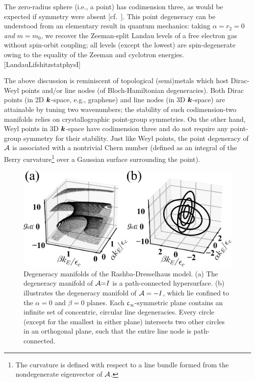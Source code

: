 \documentclass[aps, prb, showpacs, twocolumn, notitlepage, superscriptaddress]{revtex4-1}
\begin{document}
The zero-radius sphere (i.e., a point) has codimension three, as would be expected if symmetry were absent [cf.\ ].    This point degeneracy can be understood from an elementary result in quantum mechanics: taking $\alpha{=}r_2{=}0$ \textit{and} $m{=}m_0$, we recover the Zeeman-split Landau levels of a free electron gas without spin-orbit coupling; all levels (except the lowest) are spin-degenerate owing to the equality of the Zeeman and cyclotron energies.[LandauLifshitzstatphysI]

The above discussion is reminiscent of topological (semi)metals which host Dirac-Weyl points and/or line nodes (of Bloch-Hamiltonian degeneracies). Both Dirac points (in 2D $\boldsymbol{k}$-space, e.g., graphene) and  line nodes (in 3D $\boldsymbol{k}$-space) are attainable by tuning two wavenumbers; the stability of such codimension-two manifolds
 relies on crystallographic point-group symmetries. On the other hand,  Weyl points in 3D $\boldsymbol{k}$-space have codimension three and do not require any  point-group symmetry for their stability. Just like Weyl points, the point degeneracy of ${\cal A}$ is associated with a nontrivial Chern number (defined as an integral of the Berry curvature\footnote{The curvature is defined with respect to a line bundle formed from the nondegenerate eigenvector of ${\cal A}$.} over a Gaussian surface surrounding the point). 


\begin{figure}
\includegraphics[width=1.0\columnwidth]{dgn.png}
\caption{Degeneracy manifolds of the Rashba-Dresselhaus model. (a) The degeneracy manifold of ${\cal A}{=}I$ is a path-connected hypersurface. (b) illustrates the degeneracy manifold of ${\cal A}=-I$, which lie confined to  the $\alpha{=}0$ and $\beta{=}0$ planes. Each $\mathfrak{c}_{\infty}$-symmetric plane contains an infinite set of concentric, circular line degeneracies. Every circle (except for the smallest in either plane)  intersects two other circles in an orthogonal plane, such that the entire line node is path-connected. \label{fig:dgn}}
\end{figure}
\end{document}
